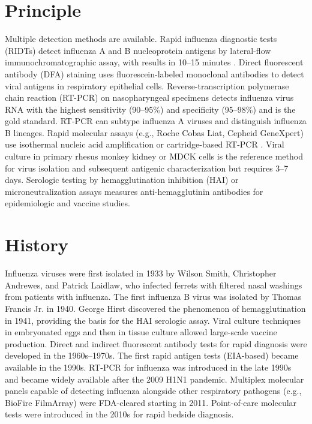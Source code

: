 \section*{Principle}
Multiple detection methods are available. Rapid influenza diagnostic tests (RIDTs) detect influenza A and B nucleoprotein antigens by lateral-flow immunochromatographic assay, with results in 10--15 minutes \cite{merckx2017diagnostic}. Direct fluorescent antibody (DFA) staining uses fluorescein-labeled monoclonal antibodies to detect viral antigens in respiratory epithelial cells. Reverse-transcription polymerase chain reaction (RT-PCR) on nasopharyngeal specimens detects influenza virus RNA with the highest sensitivity (90--95\%) and specificity (95--98\%) and is the gold standard. RT-PCR can subtype influenza A viruses and distinguish influenza B lineages. Rapid molecular assays (e.g., Roche Cobas Liat, Cepheid GeneXpert) use isothermal nucleic acid amplification or cartridge-based RT-PCR \cite{vos2019rapid}. Viral culture in primary rhesus monkey kidney or MDCK cells is the reference method for virus isolation and subsequent antigenic characterization but requires 3--7 days. Serologic testing by hemagglutination inhibition (HAI) or microneutralization assays measures anti-hemagglutinin antibodies for epidemiologic and vaccine studies.

\section*{History}
Influenza viruses were first isolated in 1933 by Wilson Smith, Christopher Andrewes, and Patrick Laidlaw, who infected ferrets with filtered nasal washings from patients with influenza. The first influenza B virus was isolated by Thomas Francis Jr. in 1940. George Hirst discovered the phenomenon of hemagglutination in 1941, providing the basis for the HAI serologic assay. Viral culture techniques in embryonated eggs and then in tissue culture allowed large-scale vaccine production. Direct and indirect fluorescent antibody tests for rapid diagnosis were developed in the 1960s--1970s. The first rapid antigen tests (EIA-based) became available in the 1990s. RT-PCR for influenza was introduced in the late 1990s and became widely available after the 2009 H1N1 pandemic. Multiplex molecular panels capable of detecting influenza alongside other respiratory pathogens (e.g., BioFire FilmArray) were FDA-cleared starting in 2011. Point-of-care molecular tests were introduced in the 2010s for rapid bedside diagnosis.

